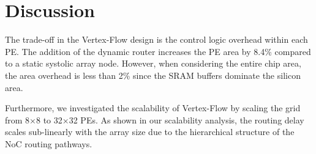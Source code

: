 \section{Discussion}
\label{sec:discussion}
The trade-off in the Vertex-Flow design is the control logic overhead within each PE. The addition of the dynamic router increases the PE area by 8.4\% compared to a static systolic array node. However, when considering the entire chip area, the area overhead is less than 2\% since the SRAM buffers dominate the silicon area.

Furthermore, we investigated the scalability of Vertex-Flow by scaling the grid from 8$\times$8 to 32$\times$32 PEs. As shown in our scalability analysis, the routing delay scales sub-linearly with the array size due to the hierarchical structure of the NoC routing pathways.
